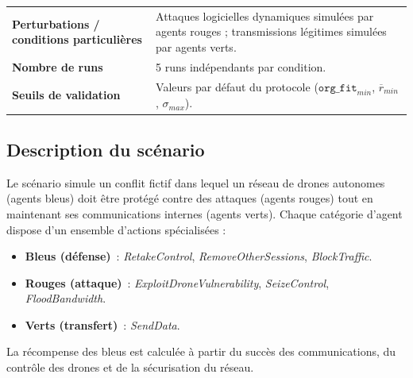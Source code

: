 \begin{table}[h!]
{\begin{tabular}{p{5cm}p{8.5cm}}
      \textbf{Perturbations / conditions particulières} & Attaques logicielles dynamiques simulées par agents rouges ; transmissions légitimes simulées par agents verts.                                                                                                                                                                                                   \\

      \textbf{Nombre de runs}                           & 5 runs indépendants par condition.                                                                                                                                                                                                                                                                                \\

      \textbf{Seuils de validation}                     & Valeurs par défaut du protocole (\(\texttt{org\_fit}_{min}\), \(\overline{r}_{min}\), \(\sigma_{max}\)).                                                                                                                                                                                                          \\
      \hline
    \end{tabular}
  }
\end{table}

\subsection{Description du scénario}
Le scénario simule un conflit fictif dans lequel un réseau de drones autonomes (agents bleus) doit être protégé contre des attaques (agents rouges) tout en maintenant ses communications internes (agents verts).
Chaque catégorie d’agent dispose d’un ensemble d’actions spécialisées :
\begin{itemize}
  \item \textbf{Bleus (défense)}~: \textit{RetakeControl}, \textit{RemoveOtherSessions}, \textit{BlockTraffic}.
  \item \textbf{Rouges (attaque)}~: \textit{ExploitDroneVulnerability}, \textit{SeizeControl}, \textit{FloodBandwidth}.
  \item \textbf{Verts (transfert)}~: \textit{SendData}.
\end{itemize}
La récompense des bleus est calculée à partir du succès des communications, du contrôle des drones et de la sécurisation du réseau.

